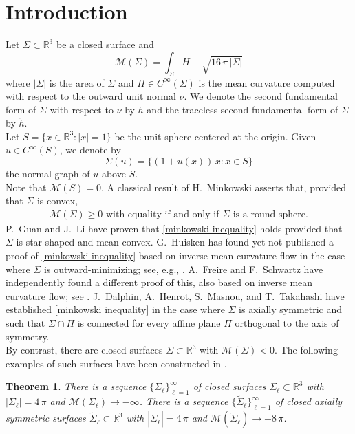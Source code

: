 \documentclass[11pt]{amsart}
\newtheorem{theorem}{Theorem}
\theoremstyle {definition}
\newcommand{\R}{\mathbb{R}}
\newcommand{\cM}{\mathcal{M}}
\begin{document}
\section{Introduction}
Let $\Sigma\subset\R^3$ be a  closed surface and
\[
\cM(\Sigma) = \int_\Sigma H - \sqrt{16\,\pi\, |\Sigma|} 
\]
where $|\Sigma|$ is the area of $\Sigma$ and  $H\in C^\infty(\Sigma)$ is the mean curvature computed with respect to the outward unit normal $\nu$. We denote the second fundamental form of $\Sigma$ with respect to $\nu$ by $h$ and the traceless second fundamental form of $\Sigma$ by $\mathring{h}$.    \\ \indent 
Let $S=\{x\in \mathbb{R}^3:|x|=1\}$ be the unit sphere centered at the origin. Given $u\in C^\infty(S)$, we denote by 
$$
\Sigma(u)=\{(1+u(x))\,x:x\in S\}
$$
 the normal graph of $u$ above $S$.  \\ \indent 
 Note that $\cM(S)=0$. A classical result of H.~Minkowski \cite[\S7]{Minkowski} asserts that, provided that $\Sigma$ is convex, 
 \begin{align} \label{minkowski inequality}\cM(\Sigma)\geq 0\text{ with equality if and only if } \Sigma\text{ is a round sphere.} \end{align}    
P.~Guan and J.~Li \cite[Theorem 2]{GuanLi} have proven that \eqref{minkowski inequality} holds provided that $\Sigma$ is star-shaped and mean-convex. G.~Huisken has found yet not published a proof of \eqref{minkowski inequality} based on inverse mean curvature flow in the case where $\Sigma$ is outward-minimizing; see, e.g., \cite[Theorem 6]{GuanLi}. A.~Freire and F.~Schwartz have independently found a different proof of this, also based on inverse mean curvature flow; see \cite[Theorem 5 and the remark on p.~119]{FreireSchwartz}.  J.~Dalphin, A.~Henrot, S.~Masnou, and T.~Takahashi \cite[Theorem 1.1]{DalphinHenrotMasnouTakahashi} have established \eqref{minkowski inequality} in the case where $\Sigma$ is axially symmetric and such that $\Sigma\cap\Pi$ is connected for every affine plane $\Pi$ orthogonal to the axis of symmetry.\\
\indent By contrast, there are closed surfaces $\Sigma\subset \mathbb{R}^3$ with $\mathcal{M}(\Sigma)<0$. The following examples of such surfaces have been constructed in \cite[Theorem 1.2]{DalphinHenrotMasnouTakahashi}. 
\begin{theorem}\label{DHMT}
There is a sequence $\{\Sigma_\ell\}_{\ell=1}^\infty$ of closed surfaces $\Sigma_\ell\subset\mathbb{R}^3$ with $|\Sigma_\ell|=4\,\pi$ and $\mathcal{M}(\Sigma_\ell)\to-\infty$. There is a sequence $\{\tilde \Sigma_\ell\}_{\ell=1}^\infty$ of  closed axially symmetric surfaces $\tilde \Sigma_\ell\subset\mathbb{R}^3$ with $|\tilde \Sigma_\ell|=4\,\pi$ and $\mathcal{M}(\tilde \Sigma_\ell)\to-8\,\pi$.
\end{theorem}
\end{document}

